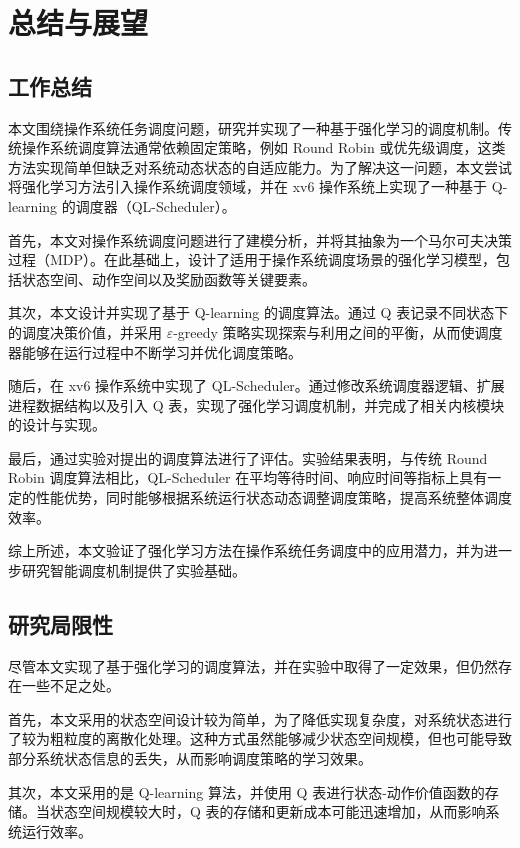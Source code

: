 \section{总结与展望}

\subsection{工作总结}

本文围绕操作系统任务调度问题，研究并实现了一种基于强化学习的调度机制。传统操作系统调度算法通常依赖固定策略，例如 Round Robin 或优先级调度，这类方法实现简单但缺乏对系统动态状态的自适应能力。为了解决这一问题，本文尝试将强化学习方法引入操作系统调度领域，并在 xv6 操作系统上实现了一种基于 Q-learning 的调度器（QL-Scheduler）。

首先，本文对操作系统调度问题进行了建模分析，并将其抽象为一个马尔可夫决策过程（MDP）。在此基础上，设计了适用于操作系统调度场景的强化学习模型，包括状态空间、动作空间以及奖励函数等关键要素。

其次，本文设计并实现了基于 Q-learning 的调度算法。通过 Q 表记录不同状态下的调度决策价值，并采用 $\varepsilon$-greedy 策略实现探索与利用之间的平衡，从而使调度器能够在运行过程中不断学习并优化调度策略。

随后，在 xv6 操作系统中实现了 QL-Scheduler。通过修改系统调度器逻辑、扩展进程数据结构以及引入 Q 表，实现了强化学习调度机制，并完成了相关内核模块的设计与实现。

最后，通过实验对提出的调度算法进行了评估。实验结果表明，与传统 Round Robin 调度算法相比，QL-Scheduler 在平均等待时间、响应时间等指标上具有一定的性能优势，同时能够根据系统运行状态动态调整调度策略，提高系统整体调度效率。

综上所述，本文验证了强化学习方法在操作系统任务调度中的应用潜力，并为进一步研究智能调度机制提供了实验基础。

\subsection{研究局限性}

尽管本文实现了基于强化学习的调度算法，并在实验中取得了一定效果，但仍然存在一些不足之处。

首先，本文采用的状态空间设计较为简单，为了降低实现复杂度，对系统状态进行了较为粗粒度的离散化处理。这种方式虽然能够减少状态空间规模，但也可能导致部分系统状态信息的丢失，从而影响调度策略的学习效果。

其次，本文采用的是 Q-learning 算法，并使用 Q 表进行状态-动作价值函数的存储。当状态空间规模较大时，Q 表的存储和更新成本可能迅速增加，从而影响系统运行效率。

